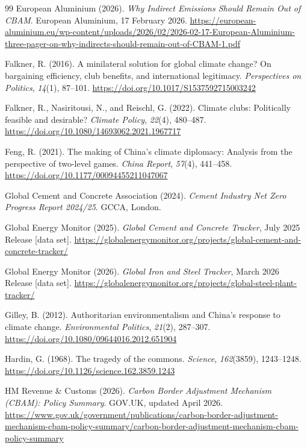 \documentclass[letterpaper, 10pt, conference]{ieeeconf}
\begin{document}
\begin{thebibliography}{99}
European Aluminium (2026).
\textit{Why Indirect Emissions Should Remain Out of {CBAM}}.
European Aluminium, 17 February 2026.
\url{https://european-aluminium.eu/wp-content/uploads/2026/02/2026-02-17-European-Aluminium-three-pager-on-why-indirects-should-remain-out-of-CBAM-1.pdf}

Falkner, R. (2016).
A minilateral solution for global climate change? On bargaining efficiency, club benefits, and international legitimacy.
\textit{Perspectives on Politics}, \textit{14}(1), 87--101.
\url{https://doi.org/10.1017/S1537592715003242}

Falkner, R., Nasiritousi, N., and Reischl, G. (2022).
Climate clubs: Politically feasible and desirable?
\textit{Climate Policy}, \textit{22}(4), 480--487.
\url{https://doi.org/10.1080/14693062.2021.1967717}

Feng, R. (2021).
The making of {China}'s climate diplomacy: Analysis from the perspective of two-level games.
\textit{China Report}, \textit{57}(4), 441--458.
\url{https://doi.org/10.1177/00094455211047067}

Global Cement and Concrete Association (2024).
\textit{Cement Industry Net Zero Progress Report 2024/25}.
GCCA, London.

Global Energy Monitor (2025).
\textit{Global Cement and Concrete Tracker}, July 2025 Release [data set].
\url{https://globalenergymonitor.org/projects/global-cement-and-concrete-tracker/}

Global Energy Monitor (2026).
\textit{Global Iron and Steel Tracker}, March 2026 Release [data set].
\url{https://globalenergymonitor.org/projects/global-steel-plant-tracker/}

Gilley, B. (2012).
Authoritarian environmentalism and {China}'s response to climate change.
\textit{Environmental Politics}, \textit{21}(2), 287--307.
\url{https://doi.org/10.1080/09644016.2012.651904}

Hardin, G. (1968).
The tragedy of the commons.
\textit{Science}, \textit{162}(3859), 1243--1248.
\url{https://doi.org/10.1126/science.162.3859.1243}

HM Revenue \& Customs (2026).
\textit{Carbon Border Adjustment Mechanism ({CBAM}): Policy Summary}.
GOV.UK, updated April 2026.
\url{https://www.gov.uk/government/publications/carbon-border-adjustment-mechanism-cbam-policy-summary/carbon-border-adjustment-mechanism-cbam-policy-summary}


\end{thebibliography}
\end{document}
